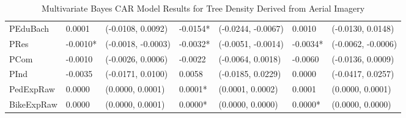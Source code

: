 \begin{table}[ht]
\begin{tabular}{lllllll}
PEduBach & 0.0001 & (-0.0108, 0.0092) & -0.0154* & (-0.0244, -0.0067) & 0.0010 & (-0.0130, 0.0148) \\
PRes & -0.0010* & (-0.0018, -0.0003) & -0.0032* & (-0.0051, -0.0014) & -0.0034* & (-0.0062, -0.0006) \\
PCom & -0.0010 & (-0.0026, 0.0006) & -0.0022 & (-0.0064, 0.0018) & -0.0060 & (-0.0136, 0.0009) \\
PInd & -0.0035 & (-0.0171, 0.0100) & 0.0058 & (-0.0185, 0.0229) & 0.0000 & (-0.0417, 0.0257) \\
PedExpRaw & 0.0000 & (0.0000, 0.0001) & 0.0001* & (0.0001, 0.0002) & 0.0001 & (0.0000, 0.0001) \\
BikeExpRaw & 0.0000 & (0.0000, 0.0001) & 0.0000* & (0.0000, 0.0000) & 0.0000* & (0.0000, 0.0000) \\
\bottomrule
\hline
\end{tabular}
\caption{Multivariate Bayes CAR Model Results for Tree Density Derived from Aerial Imagery} 
\end{table}

